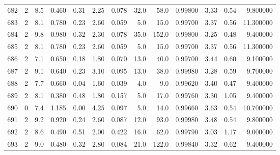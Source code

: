 \begin{tabular}{lrrrrrrrrrrrr}
682  &        2 &            8.5 &             0.460 &         0.31 &            2.25 &      0.078 &                 32.0 &                  58.0 &  0.99800 &  3.33 &       0.54 &   9.800000 \\
683  &        2 &            8.1 &             0.780 &         0.23 &            2.60 &      0.059 &                  5.0 &                  15.0 &  0.99700 &  3.37 &       0.56 &  11.300000 \\
684  &        2 &            9.8 &             0.980 &         0.32 &            2.30 &      0.078 &                 35.0 &                 152.0 &  0.99800 &  3.25 &       0.48 &   9.400000 \\
685  &        2 &            8.1 &             0.780 &         0.23 &            2.60 &      0.059 &                  5.0 &                  15.0 &  0.99700 &  3.37 &       0.56 &  11.300000 \\
686  &        2 &            7.1 &             0.650 &         0.18 &            1.80 &      0.070 &                 13.0 &                  40.0 &  0.99700 &  3.44 &       0.60 &   9.100000 \\
687  &        2 &            9.1 &             0.640 &         0.23 &            3.10 &      0.095 &                 13.0 &                  38.0 &  0.99980 &  3.28 &       0.59 &   9.700000 \\
688  &        2 &            7.7 &             0.660 &         0.04 &            1.60 &      0.039 &                  4.0 &                   9.0 &  0.99620 &  3.40 &       0.47 &   9.400000 \\
689  &        2 &            8.1 &             0.380 &         0.48 &            1.80 &      0.157 &                  5.0 &                  17.0 &  0.99760 &  3.30 &       1.05 &   9.400000 \\
690  &        0 &            7.4 &             1.185 &         0.00 &            4.25 &      0.097 &                  5.0 &                  14.0 &  0.99660 &  3.63 &       0.54 &  10.700000 \\
691  &        2 &            9.2 &             0.920 &         0.24 &            2.60 &      0.087 &                 12.0 &                  93.0 &  0.99980 &  3.48 &       0.54 &   9.800000 \\
692  &        2 &            8.6 &             0.490 &         0.51 &            2.00 &      0.422 &                 16.0 &                  62.0 &  0.99790 &  3.03 &       1.17 &   9.000000 \\
693  &        2 &            9.0 &             0.480 &         0.32 &            2.80 &      0.084 &                 21.0 &                 122.0 &  0.99840 &  3.32 &       0.62 &   9.400000 \\

\end{tabular}
